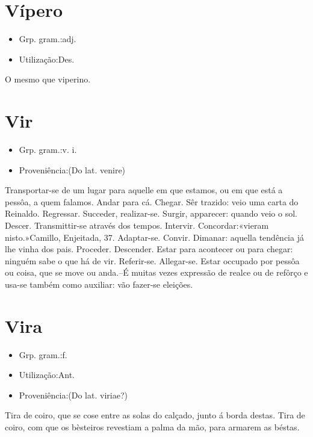\documentclass{article}
\begin{document}
\section{Vípero}
\begin{itemize}
\item {Grp. gram.:adj.}
\end{itemize}
\begin{itemize}
\item {Utilização:Des.}
\end{itemize}
O mesmo que \textunderscore viperino\textunderscore .
\section{Vir}
\begin{itemize}
\item {Grp. gram.:v. i.}
\end{itemize}
\begin{itemize}
\item {Proveniência:(Do lat. \textunderscore venire\textunderscore )}
\end{itemize}
Transportar-se de um lugar para aquelle em que estamos, ou em que está a pessôa, a quem falamos.
Andar para cá.
Chegar.
Sêr trazido: \textunderscore veio uma carta do Reinaldo\textunderscore .
Regressar.
Succeder, realizar-se.
Surgir, apparecer: \textunderscore quando veio o sol\textunderscore .
Descer.
Transmittir-se através dos tempos.
Intervir.
Concordar:«\textunderscore vieram nisto.\textunderscore »Camillo, \textunderscore Enjeitada\textunderscore , 37.
Adaptar-se.
Convir.
Dimanar: \textunderscore aquella tendência já lhe vinha dos pais\textunderscore .
Proceder.
Descender.
Estar para acontecer ou para chegar: \textunderscore ninguém sabe o que há de vir\textunderscore .
Referir-se.
Allegar-se.
Estar occupado por pessôa ou coisa, que se move ou anda.--É muitas vezes expressão de realce ou de refôrço e usa-se também como auxiliar: \textunderscore vão fazer-se eleições\textunderscore .
\section{Vira}
\begin{itemize}
\item {Grp. gram.:f.}
\end{itemize}
\begin{itemize}
\item {Utilização:Ant.}
\end{itemize}
\begin{itemize}
\item {Proveniência:(Do lat. \textunderscore viriae\textunderscore ?)}
\end{itemize}
Tira de coiro, que se cose entre as solas do calçado, junto á borda destas.
Tira de coiro, com que os bèsteiros revestiam a palma da mão, para armarem as béstas.
\end{document}
